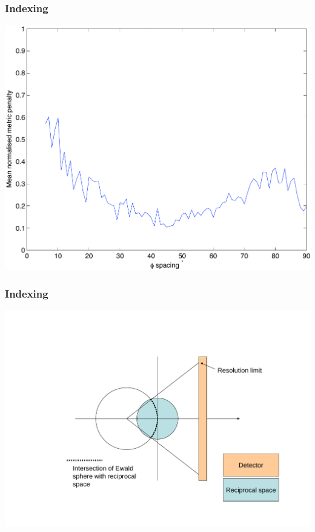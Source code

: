 \documentclass[slides,compress]{beamer}
\begin{document}
\begin{frame}
\frametitle{Indexing}
\hspace{3cm}
\includegraphics[scale=0.5]{figures/phi_spacing_90a.pdf}
\end{frame}

\begin{frame}
\frametitle{Indexing}
\hspace{6cm}
\includegraphics[scale=0.5]{figures/EwaldExplain.pdf}
\end{frame}
\end{document}
